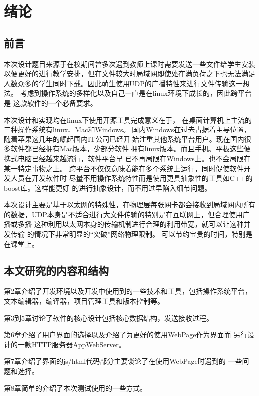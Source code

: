 \chapter{绪论}
\section{前言}
本次设计题目来源于在校期间曾多次遇到教师上课时需要发送一些文件给学生安装
以便更好的进行教学安排，但在文件较大时局域网即使处在满负荷之下也无法满足
人数众多的学生同时下载。因此萌生使用UDP的广播特性来进行文件传输这一想法。
考虑到操作系统的多样化以及自己一直是在linux环境下成长的，因此跨平台是
这款软件的一个必备要求。

本次设计和实现均在linux下使用开源工具完成意义在于，
在桌面计算机上主流的三种操作系统有linux、Mac和Windows。
国内Windows在过去占据着主导位置，随着苹果这几年的崛起国内IT公司已经开
始注重其他系统平台用户。现在国内很多软件都已经拥有Mac版本，少部分软件
拥有linux版本。而且手机、平板这些便携式电脑已经越来越流行，软件平台早
已不再局限在Windows上。也不会局限在某一特定事物之上。
跨平台不仅仅意味着能在多个系统上运行，同时促使软件开发人员在开发软件时
尽量不用操作系统特性而是使用更具抽象性的工具如C++的boost库。这样能更好
的进行抽象设计，而不用过早陷入细节问题。

本次设计主要是基于以太网的特殊性，在物理层每张网卡都会接收到局域网内所有
的数据\cite{TCP/IP}，UDP本身是不适合进行大文件传输的特别是在互联网上，但合理使用广播或多播
这种利用以太网本身的传输机制进行合理的利用带宽，就可以让这种并发传输
的情况下非常明显的``突破''网络物理限制。
可以节约宝贵的时间，特别是在课堂上。

\section{本文研究的内容和结构}
第2章介绍了开发环境以及开发中使用到的一些技术和工具，包括操作系统平台，
文本编辑器，编译器，项目管理工具和版本控制等。

第3到5章讨论了软件的核心设计包括核心数据结构，发送接收过程。

第6章介绍了用户界面的选择以及介绍了为更好的使用WebPage作为界面而
另行设计的一款HTTP服务器AppWebServer。

第7章介绍了界面的js/html代码部分主要谈论了在使用WebPage时遇到的
一些问题和选择。

第8章简单的介绍了本次测试使用的一些方式。
